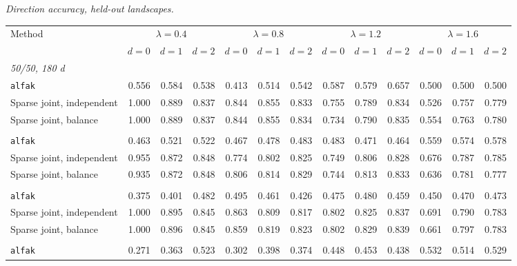 \noindent\textit{Direction accuracy, held-out landscapes.}
\begin{center}
\scriptsize
\setlength{\tabcolsep}{2.5pt}
\begin{tabular}{l*{12}{r}}
\toprule
Method & \multicolumn{3}{c}{$\lambda=0.4$} & \multicolumn{3}{c}{$\lambda=0.8$} & \multicolumn{3}{c}{$\lambda=1.2$} & \multicolumn{3}{c}{$\lambda=1.6$} \\
\cmidrule(lr){2-4}\cmidrule(lr){5-7}\cmidrule(lr){8-10}\cmidrule(lr){11-13}
 & $d=0$ & $d=1$ & $d=2$ & $d=0$ & $d=1$ & $d=2$ & $d=0$ & $d=1$ & $d=2$ & $d=0$ & $d=1$ & $d=2$ \\
\midrule
\multicolumn{13}{l}{\textit{50/50, 180 d}} \\
\quad \texttt{alfak} & 0.556 & 0.584 & 0.538 & 0.413 & 0.514 & 0.542 & 0.587 & 0.579 & 0.657 & 0.500 & 0.500 & 0.500 \\
\quad Sparse joint, independent & 1.000 & 0.889 & 0.837 & 0.844 & 0.855 & 0.833 & 0.755 & 0.789 & 0.834 & 0.526 & 0.757 & 0.779 \\
\quad Sparse joint, balance & 1.000 & 0.889 & 0.837 & 0.844 & 0.855 & 0.834 & 0.734 & 0.790 & 0.835 & 0.554 & 0.763 & 0.780 \\
\addlinespace[2pt]
\multicolumn{13}{l}{\textit{200/200, 180 d}} \\
\quad \texttt{alfak} & 0.463 & 0.521 & 0.522 & 0.467 & 0.478 & 0.483 & 0.483 & 0.471 & 0.464 & 0.559 & 0.574 & 0.578 \\
\quad Sparse joint, independent & 0.955 & 0.872 & 0.848 & 0.774 & 0.802 & 0.825 & 0.749 & 0.806 & 0.828 & 0.676 & 0.787 & 0.785 \\
\quad Sparse joint, balance & 0.935 & 0.872 & 0.848 & 0.806 & 0.814 & 0.829 & 0.744 & 0.813 & 0.833 & 0.636 & 0.781 & 0.777 \\
\addlinespace[2pt]
\multicolumn{13}{l}{\textit{200/200, 360 d}} \\
\quad \texttt{alfak} & 0.375 & 0.401 & 0.482 & 0.495 & 0.461 & 0.426 & 0.475 & 0.480 & 0.459 & 0.450 & 0.470 & 0.473 \\
\quad Sparse joint, independent & 1.000 & 0.895 & 0.845 & 0.863 & 0.809 & 0.817 & 0.802 & 0.825 & 0.837 & 0.691 & 0.790 & 0.783 \\
\quad Sparse joint, balance & 1.000 & 0.896 & 0.845 & 0.859 & 0.819 & 0.823 & 0.802 & 0.829 & 0.839 & 0.661 & 0.797 & 0.783 \\
\addlinespace[2pt]
\multicolumn{13}{l}{\textit{500/700, 360 d}} \\
\quad \texttt{alfak} & 0.271 & 0.363 & 0.523 & 0.302 & 0.398 & 0.374 & 0.448 & 0.453 & 0.438 & 0.532 & 0.514 & 0.529 \\

\end{tabular}
\end{center}

